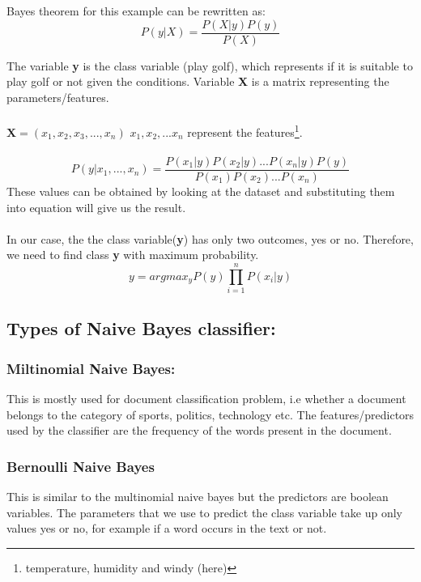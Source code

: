 \documentclass[12pt, A4]{report}
\begin{document}
	Bayes theorem for this example can be rewritten as:
	\begin{equation}
		P(y|X) = \frac{P(X|y)P(y)}{P(X)}
	\end{equation}

	The variable \textbf{y} is the class variable (play golf), which represents if it is suitable to play golf or not given the conditions. Variable \textbf{X} is a matrix representing the parameters/features.
	\\ \\
	$\textbf{X} = (x_1, x_2, x_3, ... , x_n)$ \hfill	\small{$x_1, x_2, ... x_n$ represent the features}\footnote[1]{temperature, humidity and windy (here)}.
	\\ \\

	\begin{equation}
		P(y|x_1, ..., x_n) = \frac{P(x_1|y)P(x_2|y)...P(x_n|y)P(y)}{P(x_1)P(x_2)...P(x_n)}
	\end{equation}
	These values can be obtained by looking at the dataset and substituting them into equation will give us the result.
	\\ \\
	In our case, the the class variable(\textbf{y}) has only two outcomes, yes or no. Therefore, we need to find class \textbf{y} with maximum probability. 
	\begin{equation}
		y = argmax_yP(y)\prod_{i=1}^{n}P(x_i|y)
	\end{equation}

\subsection*{Types of Naive Bayes classifier:}
	\subsubsection*{Miltinomial Naive Bayes:}
		This is mostly used for document classification problem, i.e whether a document belongs to the category of sports, politics, technology etc. The features/predictors used by the classifier are the frequency of the words present in the document.

	\subsubsection*{Bernoulli Naive Bayes}
		This is similar to the multinomial naive bayes but the predictors are boolean variables. The parameters that we use to predict the class variable take up only values yes or no, for example if a word occurs in the text or not.
\end{document}
